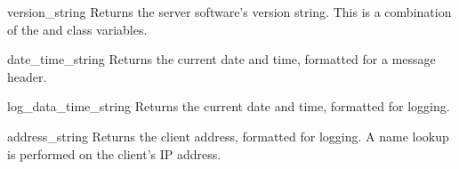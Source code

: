 \begin{methoddesc}{version_string}{}
Returns the server software's version string. This is a combination
of the  and  class variables.
\end{methoddesc}

\begin{methoddesc}{date_time_string}{}
Returns the current date and time, formatted for a message header.
\end{methoddesc}

\begin{methoddesc}{log_data_time_string}{}
Returns the current date and time, formatted for logging.
\end{methoddesc}

\begin{methoddesc}{address_string}{}
Returns the client address, formatted for logging. A name lookup
is performed on the client's IP address.
\end{methoddesc}


\begin{seealso}

\end{seealso}

